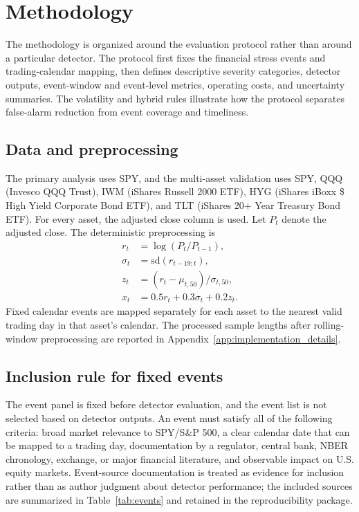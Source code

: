 \documentclass[10pt,twocolumn]{article}
\begin{document}
\section{Methodology}
The methodology is organized around the evaluation protocol rather than around a particular detector. The protocol first fixes the financial stress events and trading-calendar mapping, then defines descriptive severity categories, detector outputs, event-window and event-level metrics, operating costs, and uncertainty summaries. The volatility and hybrid rules illustrate how the protocol separates false-alarm reduction from event coverage and timeliness.

\subsection{Data and preprocessing}
The primary analysis uses SPY, and the multi-asset validation uses SPY, QQQ (Invesco QQQ Trust), IWM (iShares Russell 2000 ETF), HYG (iShares iBoxx \$ High Yield Corporate Bond ETF), and TLT (iShares 20+ Year Treasury Bond ETF). For every asset, the adjusted close column is used. Let $P_t$ denote the adjusted close. The deterministic preprocessing is
\begin{align}
r_t &= \log(P_t/P_{t-1}),\\
\sigma_t &= \mathrm{sd}(r_{t-19:t}),\\
z_t &= (r_t-\mu_{t,50})/\sigma_{t,50},\\
x_t &= 0.5r_t + 0.3\sigma_t + 0.2z_t.
\end{align}
Fixed calendar events are mapped separately for each asset to the nearest valid trading day in that asset's calendar. The processed sample lengths after rolling-window preprocessing are reported in Appendix~\ref{app:implementation_details}.

\subsection{Inclusion rule for fixed events}
The event panel is fixed before detector evaluation, and the event list is not selected based on detector outputs. An event must satisfy all of the following criteria: broad market relevance to SPY/S\&P 500, a clear calendar date that can be mapped to a trading day, documentation by a regulator, central bank, NBER chronology, exchange, or major financial literature, and observable impact on U.S. equity markets. Event-source documentation is treated as evidence for inclusion rather than as author judgment about detector performance; the included sources are summarized in Table~\ref{tab:events} and retained in the reproducibility package.
\end{document}
